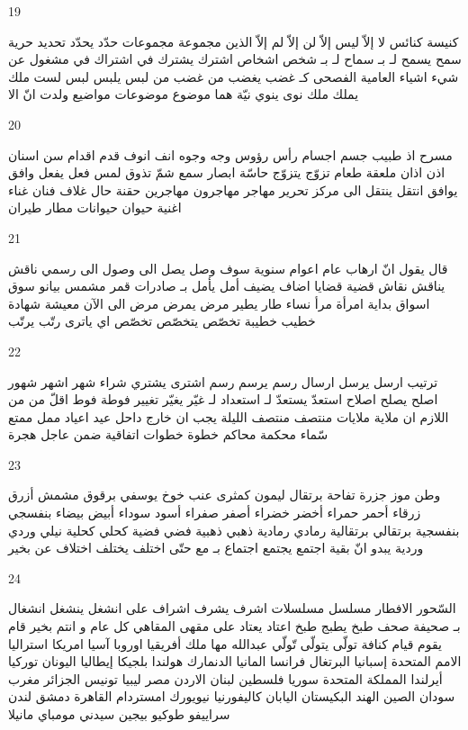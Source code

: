 \documentclass[twocolumn,a4paper]{article}
\begin{document}
19

\textarabic{ كنيسة  كنائس  
 لا إلاّ ليس إلاّ لن إلاّ  لم إلاّ  
 الذين  
 مجموعة  مجموعات
 حدّد  يحدّد  
 تحديد  
 حرية  
 سمح  يسمح لـ بـ  
 سماح لـ بـ  
 شخص  اشخاص  
 اشترك  يشترك في  
 اشتراك في  
 مشغول عن  
 شيء  اشياء  
 العامية  
 الفصحى  
 كـ  
 غضب  يغضب من   
 غضب من  
 لبس  يلبس  
 لبس  
 لست  
 ملك  يملك  
 ملك  
 نوى  ينوي  
 نيّة  
 هما  
 موضوع  موضوعات
 مواضيع  
 ولدت  
 انّ  
 الا  
}

20

\textarabic{ مسرح  
 اذ  
 طبيب  
 جسم  اجسام  
 رأس  رؤوس  
 وجه  وجوه  
 انف  انوف  
 قدم  اقدام  
 سن  اسنان  
 اذن  اذان  
 ملعقة  
 طعام  
 تزوّج  يتزوّج  
 حاسّة  
 ابصار  
 سمع  
 شمّ  
 تذوق  
 لمس  
 فعل  يفعل  
 وافق  يوافق  
 انتقل  ينتقل الى 
 مركز  
 تحرير  
 مهاجر  مهاجرون
  مهاجرين
  حقنة  
 حال  
 غلاف  
 فنان  
 غناء  
 اغنية  
 حيوان  حيوانات
 مطار  
 طيران  
}

21

\textarabic{ قال  يقول انّ  
 ارهاب  
 عام  اعوام  
 سنوية  
 سوف  
 وصل  يصل الى  
 وصول الى  
 رسمي  
 ناقش  يناقش  
 نقاش  
 قضية  قضايا  
 اضاف  يضيف  
 أمل  يأمل بـ  
 صادرات  
 قمر  
 مشمس  
 بيانو  
 سوق  اسواق  
 بداية  
 امرأة  مرأ  
 نساء  
 طار  يطير  
 مرض  يمرض  
 مرض  
 الى اﻵن  
 معيشة  
 شهادة  
 خطيب  خطيبة  
 تخصّص  يتخصّص  
 تخصّص  
 اي  
 ياترى  
 رتّب  يرتّب  
}

22

\textarabic{ ترتيب  
 ارسل  يرسل  
 ارسال  
 رسم  يرسم  
 رسم  
 اشترى  يشتري  
 شراء  
 شهر  اشهر  شهور  
 اصلح  يصلح  
 اصلاح  
 استعدّ  يستعدّ لـ  
 استعداد لـ  
 غيّر  يغيّر  
 تغيير  
 فوطة  فوط  
 اقلّ من  
 من اللازم ان  
 ملاية  ملايات
 منتصف  
 منتصف الليلة  
 يجب ان  
 خارج  
 داحل  
 عيد  اعياد  
 ممل  
 ممتع  
 سّماء  
 محكمة  محاكم  
 خطوة  خطوات
 اتفاقية  
 ضمن  
 عاجل  
 هجرة  
}

23

\textarabic{ وطن  
 موز  
 جزرة  
 تفاحة  
 برتقال  
 ليمون  
 كمثرى  
 عنب  
 خوخ  
 يوسفي  
 برقوق  
 مشمش  
 أزرق  زرقاء  
 أحمر  حمراء  
 أخضر  خضراء  
 أصفر  صفراء  
 أسود  سوداء  
 أبيض  بيضاء  
 بنفسجي  بنفسجية  
 برتقالي  برتقالية  
 رمادي  رمادية  
 ذهبي  ذهبية  
 فضي  فضية  
 كحلي  كحلية  
 نيلي  
 وردي  وردية  
 يبدو انّ  
 بقية  
 اجتمع  يجتمع  اجتماع بـ  مع  
 حتّى  
 اختلف  يختلف  اختلاف عن  
 بخير  
}

24

\textarabic{ السّحور  
 الافطار  
 مسلسل  مسلسلات
 اشرف  يشرف  اشراف على  
 انشغل  ينشغل  انشغال بـ  
 صحيفة  صحف  
 طبخ  يطبج  
 طبخ  
 اعتاد  يعتاد على  
 مقهى المقاهي  
 كل عام و انتم بخير  
 قام  يقوم  
 قيام  
 كنافة  
 تولّى  يتولّى  
 تّولّي  
}\clearpage
\textarabic{
 عبدالله  
 مها  
 ملك  
}\clearpage
\textarabic{
 أفريقيا  
 اوروبا  
 آسيا  
 امريكا  
 استراليا  
 اﻻمم المتحدة  
 إسبانيا  
 البرتغال  
 فرانسا  
 المانيا  
  الدنمارك 
 هولندا  
 بلجيكا  
 إيطاليا  
 اليونان  
 توركيا  
 أيرلندا  
 المملكة المتحدة 
 سوريا  
 فلسطين  
 لبنان  
 الاردن  
 مصر  
 ليبيا  
 تونيس  
 الجزائر  
 مغرب  
 سودان  
 الصين  
 الهند  
 البكيستان  
 اليابان  
 كاليفورنيا  
 نيويورك  
 امستردام  
 القاهرة  
 دمشق  
 لندن  
 سراييفو  
 طوكيو  
 بيجين  
 سيدني  
 مومباي  
 مانيلا  
}
\end{document}

